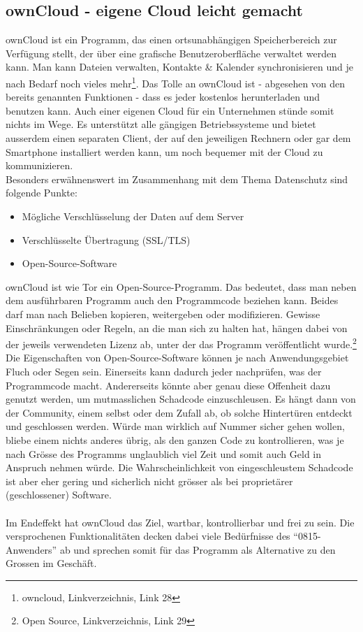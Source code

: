\subsection{ownCloud - eigene Cloud leicht gemacht}
ownCloud ist ein Programm, das einen ortsunabhängigen Speicherbereich zur Verfügung stellt, der über eine grafische Benutzeroberfläche verwaltet werden kann. Man kann Dateien verwalten, Kontakte \& Kalender synchronisieren und je nach Bedarf noch vieles mehr\footnote{owncloud, Linkverzeichnis, Link 28}.
Das Tolle an ownCloud ist - abgesehen von den bereits genannten Funktionen - dass es jeder kostenlos herunterladen und benutzen kann. Auch einer eigenen Cloud für ein Unternehmen stünde somit nichts im Wege. Es unterstützt alle gängigen Betriebssysteme und bietet ausserdem einen separaten Client, der auf den jeweiligen Rechnern oder gar dem Smartphone installiert werden kann, um noch bequemer mit der Cloud zu kommunizieren.
\\
Besonders erwähnenswert im Zusammenhang mit dem Thema Datenschutz sind folgende Punkte:

\begin{itemize}
\item Mögliche Verschlüsselung der Daten auf dem Server
\item Verschlüsselte Übertragung (SSL/TLS)
\item Open-Source-Software
\end{itemize}

ownCloud ist wie Tor ein Open-Source-Programm. Das bedeutet, dass man neben dem ausführbaren Programm auch den Programmcode beziehen kann. Beides darf man nach Belieben kopieren, weitergeben oder modifizieren. Gewisse Einschränkungen oder Regeln, an die man sich zu halten hat, hängen dabei von der jeweils verwendeten Lizenz ab, unter der das Programm veröffentlicht wurde.\footnote{Open Source, Linkverzeichnis, Link 29}
Die Eigenschaften von Open-Source-Software können je nach Anwendungsgebiet Fluch oder Segen sein. Einerseits kann dadurch jeder nachprüfen, was der Programmcode macht. Andererseits könnte aber genau diese Offenheit dazu genutzt werden, um mutmasslichen Schadcode einzuschleusen. Es hängt dann von der Community, einem selbst oder dem Zufall ab, ob solche Hintertüren entdeckt und geschlossen werden. Würde man wirklich auf Nummer sicher gehen wollen, bliebe einem nichts anderes übrig, als den ganzen Code zu kontrollieren, was je nach Grösse des Programms unglaublich viel Zeit und somit auch Geld in Anspruch nehmen würde. Die Wahrscheinlichkeit von eingeschleustem Schadcode ist aber eher gering und sicherlich nicht grösser als bei proprietärer (geschlossener) Software.
\\
\\
Im Endeffekt hat ownCloud das Ziel, wartbar, kontrollierbar und frei zu sein. Die versprochenen Funktionalitäten decken dabei viele Bedürfnisse des ``0815-Anwenders'' ab und sprechen somit für das Programm als Alternative zu den Grossen im Geschäft.

